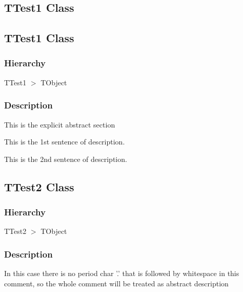 \documentclass{report}
\newif\ifpdf
\begin{document}
\subsection*{\large{\textbf{TTest1 Class}}\normalsize\hspace{1ex}\hrulefill}
\else
\subsection*{TTest1 Class}
\fi
\label{ok_auto_abstract.TTest1}
\subsubsection*{\large{\textbf{Hierarchy}}\normalsize\hspace{1ex}\hfill}
TTest1 {$>$} TObject
\subsubsection*{\large{\textbf{Description}}\normalsize\hspace{1ex}\hfill}
This is the explicit abstract section\hfill\vspace*{1ex}

This is the 1st sentence of description.

This is the 2nd sentence of description.

\ifpdf
\subsection*{\large{\textbf{TTest2 Class}}\normalsize\hspace{1ex}\hrulefill}
\else
\subsection*{TTest2 Class}
\fi
\label{ok_auto_abstract.TTest2}
\subsubsection*{\large{\textbf{Hierarchy}}\normalsize\hspace{1ex}\hfill}
TTest2 {$>$} TObject
\subsubsection*{\large{\textbf{Description}}\normalsize\hspace{1ex}\hfill}
In this case there is no period char '.' that is followed by whitespace in this comment, so the whole comment will be treated as abstract description\ifpdf
\end{document}
